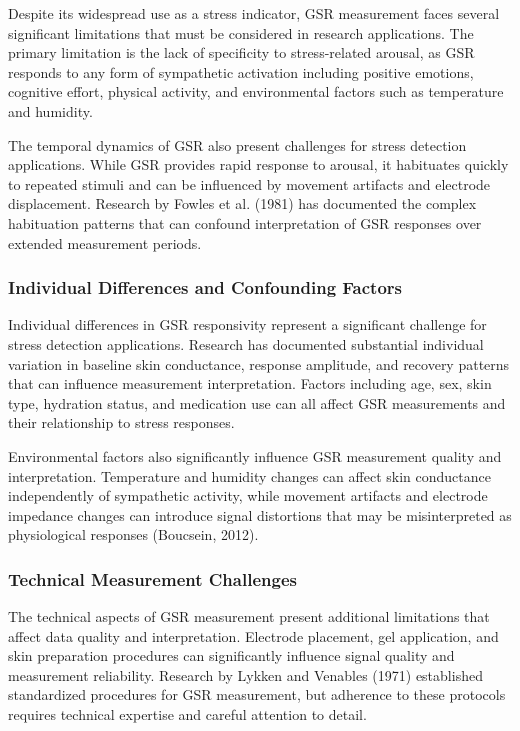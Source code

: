 \documentclass[11pt,a4paper]{article}
\begin{document}
Despite its widespread use as a stress indicator, GSR measurement faces several significant limitations that must be
considered in research applications. The primary limitation is the lack of specificity to stress-related arousal, as GSR
responds to any form of sympathetic activation including positive emotions, cognitive effort, physical activity, and
environmental factors such as temperature and humidity.

The temporal dynamics of GSR also present challenges for stress detection applications. While GSR provides rapid
response to arousal, it habituates quickly to repeated stimuli and can be influenced by movement artifacts and electrode
displacement. Research by Fowles et al. (1981) has documented the complex habituation patterns that can confound
interpretation of GSR responses over extended measurement periods.

\subsubsection{Individual Differences and Confounding Factors}

Individual differences in GSR responsivity represent a significant challenge for stress detection applications. Research
has documented substantial individual variation in baseline skin conductance, response amplitude, and recovery patterns
that can influence measurement interpretation. Factors including age, sex, skin type, hydration status, and medication
use can all affect GSR measurements and their relationship to stress responses.

Environmental factors also significantly influence GSR measurement quality and interpretation. Temperature and humidity
changes can affect skin conductance independently of sympathetic activity, while movement artifacts and electrode
impedance changes can introduce signal distortions that may be misinterpreted as physiological responses (Boucsein,
2012).

\subsubsection{Technical Measurement Challenges}

The technical aspects of GSR measurement present additional limitations that affect data quality and interpretation.
Electrode placement, gel application, and skin preparation procedures can significantly influence signal quality and
measurement reliability. Research by Lykken and Venables (1971) established standardized procedures for GSR measurement,
but adherence to these protocols requires technical expertise and careful attention to detail.
\end{document}

